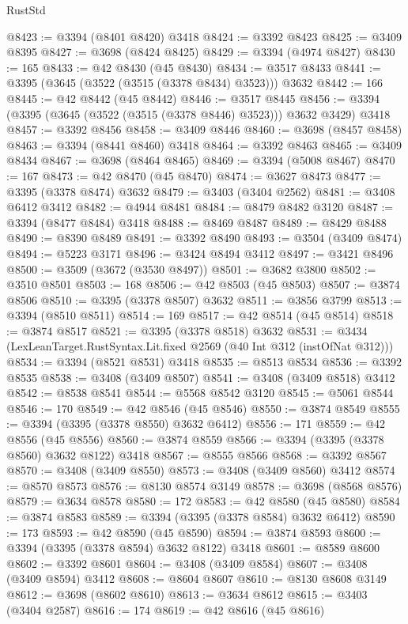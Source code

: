 \begin{lexlean}{RustStd}
\begin{coremodule}
@8423 := @3394 (@8401 @8420) @3418
@8424 := @3392 @8423
@8425 := @3409 @8395
@8427 := @3698 (@8424 @8425)
@8429 := @3394 (@4974 @8427)
@8430 := 165
@8433 := @42 @8430 (@45 @8430)
@8434 := @3517 @8433
@8441 := @3395 (@3645 (@3522 (@3515 (@3378 @8434) @3523))) @3632
@8442 := 166
@8445 := @42 @8442 (@45 @8442)
@8446 := @3517 @8445
@8456 := @3394 (@3395 (@3645 (@3522 (@3515 (@3378 @8446) @3523))) @3632 @3429) @3418
@8457 := @3392 @8456
@8458 := @3409 @8446
@8460 := @3698 (@8457 @8458)
@8463 := @3394 (@8441 @8460) @3418
@8464 := @3392 @8463
@8465 := @3409 @8434
@8467 := @3698 (@8464 @8465)
@8469 := @3394 (@5008 @8467)
@8470 := 167
@8473 := @42 @8470 (@45 @8470)
@8474 := @3627 @8473
@8477 := @3395 (@3378 @8474) @3632
@8479 := @3403 (@3404 @2562)
@8481 := @3408 @6412 @3412
@8482 := @4944 @8481
@8484 := @8479 @8482 @3120
@8487 := @3394 (@8477 @8484) @3418
@8488 := @8469 @8487
@8489 := @8429 @8488
@8490 := @8390 @8489
@8491 := @3392 @8490
@8493 := @3504 (@3409 @8474)
@8494 := @5223 @3171
@8496 := @3424 @8494 @3412
@8497 := @3421 @8496
@8500 := @3509 (@3672 (@3530 @8497))
@8501 := @3682 @3800
@8502 := @3510 @8501
@8503 := 168
@8506 := @42 @8503 (@45 @8503)
@8507 := @3874 @8506
@8510 := @3395 (@3378 @8507) @3632
@8511 := @3856 @3799
@8513 := @3394 (@8510 @8511)
@8514 := 169
@8517 := @42 @8514 (@45 @8514)
@8518 := @3874 @8517
@8521 := @3395 (@3378 @8518) @3632
@8531 := @3434 (LexLeanTarget.RustSyntax.Lit.fixed @2569 (@40 Int @312 (instOfNat @312)))
@8534 := @3394 (@8521 @8531) @3418
@8535 := @8513 @8534
@8536 := @3392 @8535
@8538 := @3408 (@3409 @8507)
@8541 := @3408 (@3409 @8518) @3412
@8542 := @8538 @8541
@8544 := @5568 @8542 @3120
@8545 := @5061 @8544
@8546 := 170
@8549 := @42 @8546 (@45 @8546)
@8550 := @3874 @8549
@8555 := @3394 (@3395 (@3378 @8550) @3632 @6412)
@8556 := 171
@8559 := @42 @8556 (@45 @8556)
@8560 := @3874 @8559
@8566 := @3394 (@3395 (@3378 @8560) @3632 @8122) @3418
@8567 := @8555 @8566
@8568 := @3392 @8567
@8570 := @3408 (@3409 @8550)
@8573 := @3408 (@3409 @8560) @3412
@8574 := @8570 @8573
@8576 := @8130 @8574 @3149
@8578 := @3698 (@8568 @8576)
@8579 := @3634 @8578
@8580 := 172
@8583 := @42 @8580 (@45 @8580)
@8584 := @3874 @8583
@8589 := @3394 (@3395 (@3378 @8584) @3632 @6412)
@8590 := 173
@8593 := @42 @8590 (@45 @8590)
@8594 := @3874 @8593
@8600 := @3394 (@3395 (@3378 @8594) @3632 @8122) @3418
@8601 := @8589 @8600
@8602 := @3392 @8601
@8604 := @3408 (@3409 @8584)
@8607 := @3408 (@3409 @8594) @3412
@8608 := @8604 @8607
@8610 := @8130 @8608 @3149
@8612 := @3698 (@8602 @8610)
@8613 := @3634 @8612
@8615 := @3403 (@3404 @2587)
@8616 := 174
@8619 := @42 @8616 (@45 @8616)

\end{coremodule}
\end{lexlean}
